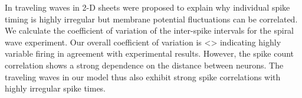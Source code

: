 \begin{figure}[!htb]
 \label{fig:2DWaveTransition}
\end{figure}
 \FloatBarrier

 In \citet{keane2015} traveling waves in 2-D sheets were proposed to explain why individual spike timing is highly irregular 
but membrane potential fluctuations can be correlated.
We calculate the coefficient of variation of the inter-spike intervals for the spiral wave experiment.
Our overall coefficient of variation is <> indicating highly variable firing in agreement with experimental results.
However, the spike count correlation shows a strong dependence on the distance between neurons.
The traveling waves in our model thus also exhibit strong spike correlations with highly irregular spike times.
